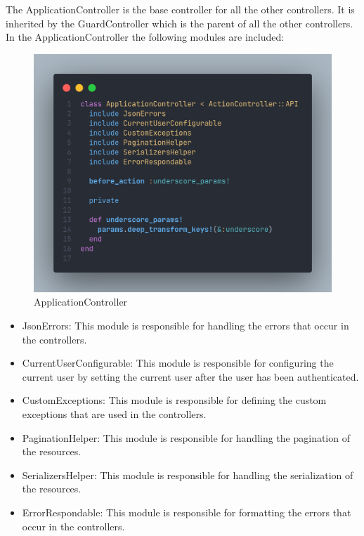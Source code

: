 \begin{justify}
    \vspace{0.25cm}
    \newendline The ApplicationController is the base controller for all the other controllers. It is inherited by the GuardController which is the parent of all the other controllers. In the ApplicationController the following modules are included:

    \begin{figure}[H]
        \centerline{\includegraphics[width=150mm,scale=1]{figures/implementation_and_testing/implementation/backend/application_controller.png}}
        \caption{ApplicationController}
    \end{figure}

    \begin{itemize}
        \item JsonErrors: This module is responsible for handling the errors that occur in the controllers.
        \item CurrentUserConfigurable: This module is responsible for configuring the current user by setting the current user after the user has been authenticated.
        \item CustomExceptions: This module is responsible for defining the custom exceptions that are used in the controllers.
        \item PaginationHelper: This module is responsible for handling the pagination of the resources.
        \item SerializersHelper: This module is responsible for handling the serialization of the resources.
        \item ErrorRespondable: This module is responsible for formatting the errors that occur in the controllers.
    \end{itemize}


\end{justify}
